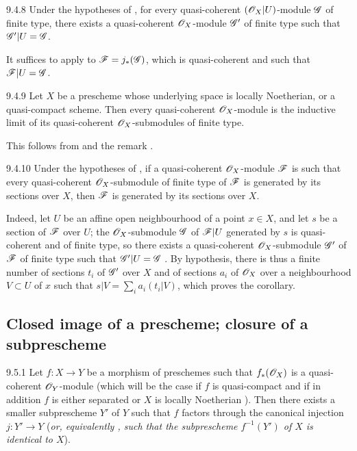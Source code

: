 \begin{envs}[Corollary]{9.4.8}
\label{cor-1.9.4.8}
Under the hypotheses of , for every quasi-coherent $(\mathscr{O}_X|U)$-module
$\mathscr{G}$ of finite type, there exists a quasi-coherent $\mathscr{O}_X$-module $\mathscr{G}'$ of finite
type such that $\mathscr{G}'|U=\mathscr{G}$.
\end{envs}

It suffices to apply  to $\mathscr{F}=j_*(\mathscr{G})$, which is quasi-coherent
 and such that $\mathscr{F}|U=\mathscr{G}$.

\begin{envs}[Corollary]{9.4.9}
\label{cor-1.9.4.9}
Let $X$ be a prescheme whose underlying space is locally Noetherian, or a quasi-compact
scheme. Then every quasi-coherent $\mathscr{O}_X$-module is the inductive limit of its quasi-coherent
$\mathscr{O}_X$-submodules of finite type.
\end{envs}

This follows from  and the remark .

\begin{envs}[Corollary]{9.4.10}
\label{cor-1.9.4.10}
Under the hypotheses of , if a quasi-coherent $\mathscr{O}_X$-module $\mathscr{F}$ is
such that every quasi-coherent $\mathscr{O}_X$-submodule of finite type of $\mathscr{F}$ is generated by
its sections over $X$, then $\mathscr{F}$ is generated by its sections over $X$.
\end{envs}

Indeed, let $U$ be an affine open neighbourhood of a point $x\in X$, and let $s$ be a
section of $\mathscr{F}$ over $U$; the $\mathscr{O}_X$-submodule $\mathscr{G}$ of $\mathscr{F}|U$ generated by $s$
is quasi-coherent and of finite type, so there exists a quasi-coherent $\mathscr{O}_X$-submodule
$\mathscr{G}'$ of $\mathscr{F}$ of finite type such that $\mathscr{G}'|U=\mathscr{G}$ . By
hypothesis, there is thus a finite number of sections $t_i$ of $\mathscr{G}'$ over $X$ and of
sections $a_i$ of $\mathscr{O}_X$ over a neighbourhood $V\subset U$ of $x$ such that
$s|V=\sum_i a_i(t_i|V)$, which proves the corollary.

\subsection{Closed image of a prescheme; closure of a subprescheme}
\label{1-schemes-9.5}        

\begin{envs}[Proposition]{9.5.1}
\label{prop-1.9.5.1}
Let $f:X\to Y$ be a morphism of preschemes such that $f_*(\mathscr{O}_X)$ is a quasi-coherent
$\mathscr{O}_Y$-module (which will be the case if $f$ is quasi-compact and if in addition $f$ is
either separated or $X$ is locally Noetherian ). Then there exists a smaller
subprescheme $Y'$ of $Y$ such that $f$ factors through the canonical injection $j:Y'\to Y$
(\emph{or, equivalently , such that the subprescheme $f^{-1}(Y')$ of $X$ is
\emph{identical} to $X$}).
\end{envs}

